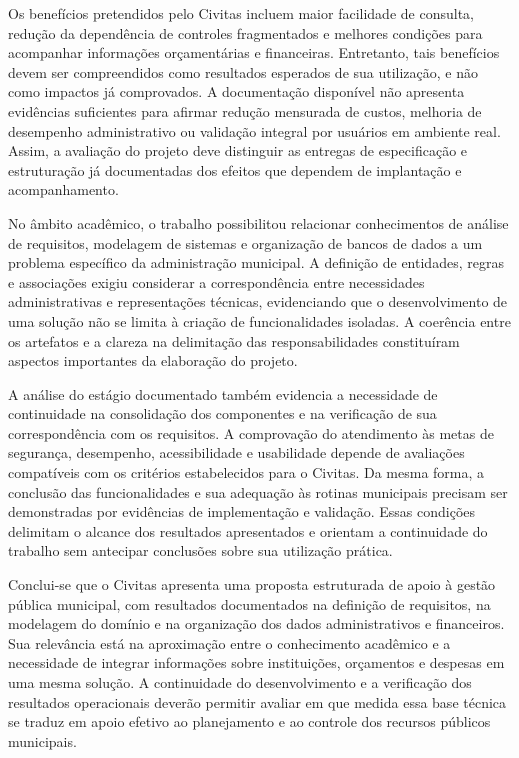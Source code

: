 Os benefícios pretendidos pelo Civitas incluem maior facilidade de consulta, redução da dependência de controles fragmentados e melhores condições para acompanhar informações orçamentárias e financeiras. Entretanto, tais benefícios devem ser compreendidos como resultados esperados de sua utilização, e não como impactos já comprovados. A documentação disponível não apresenta evidências suficientes para afirmar redução mensurada de custos, melhoria de desempenho administrativo ou validação integral por usuários em ambiente real. Assim, a avaliação do projeto deve distinguir as entregas de especificação e estruturação já documentadas dos efeitos que dependem de implantação e acompanhamento.

No âmbito acadêmico, o trabalho possibilitou relacionar conhecimentos de análise de requisitos, modelagem de sistemas e organização de bancos de dados a um problema específico da administração municipal. A definição de entidades, regras e associações exigiu considerar a correspondência entre necessidades administrativas e representações técnicas, evidenciando que o desenvolvimento de uma solução não se limita à criação de funcionalidades isoladas. A coerência entre os artefatos e a clareza na delimitação das responsabilidades constituíram aspectos importantes da elaboração do projeto.

A análise do estágio documentado também evidencia a necessidade de continuidade na consolidação dos componentes e na verificação de sua correspondência com os requisitos. A comprovação do atendimento às metas de segurança, desempenho, acessibilidade e usabilidade depende de avaliações compatíveis com os critérios estabelecidos para o Civitas. Da mesma forma, a conclusão das funcionalidades e sua adequação às rotinas municipais precisam ser demonstradas por evidências de implementação e validação. Essas condições delimitam o alcance dos resultados apresentados e orientam a continuidade do trabalho sem antecipar conclusões sobre sua utilização prática.

Conclui-se que o Civitas apresenta uma proposta estruturada de apoio à gestão pública municipal, com resultados documentados na definição de requisitos, na modelagem do domínio e na organização dos dados administrativos e financeiros. Sua relevância está na aproximação entre o conhecimento acadêmico e a necessidade de integrar informações sobre instituições, orçamentos e despesas em uma mesma solução. A continuidade do desenvolvimento e a verificação dos resultados operacionais deverão permitir avaliar em que medida essa base técnica se traduz em apoio efetivo ao planejamento e ao controle dos recursos públicos municipais.
